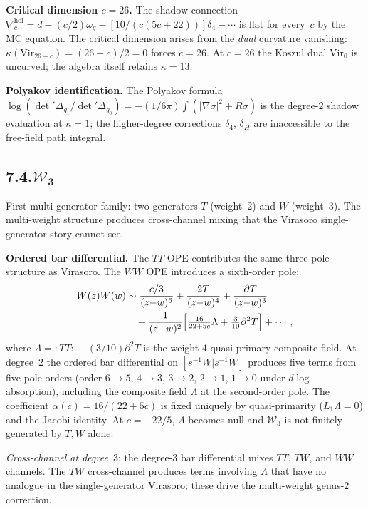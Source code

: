 \documentclass[11pt,reqno]{amsart}
\theoremstyle{definition}
\theoremstyle{remark}
\providecommand{\cW}{\mathcal{W}}
\providecommand{\Vir}{\mathrm{Vir}}
\providecommand{\hol}{\mathrm{hol}}
\numberwithin{equation}{section}
\begin{document}
\medskip\noindent\textbf{Critical dimension $c=26$.}\enspace
The shadow connection
$\nabla^{\hol}_c=d-(c/2)\omega_g
-[10/(c(5c+22))]\delta_4-\cdots$
is flat for every~$c$ by the MC equation. The critical dimension
arises from the \emph{dual} curvature vanishing:
$\kappa(\Vir_{26-c})=(26-c)/2=0$ forces $c=26$. At $c=26$ the
Koszul dual $\Vir_0$ is uncurved; the algebra itself retains
$\kappa=13$.

\medskip\noindent\textbf{Polyakov identification.}\enspace
The Polyakov formula
$\log(\det'\Delta_{g_1}/\det'\Delta_{g_0})
=-(1/6\pi)\int(|\nabla\sigma|^2+R\sigma)$
is the degree-$2$ shadow evaluation at $\kappa=1$; the
higher-degree corrections $\delta_4$, $\delta_H$ are
inaccessible to the free-field path integral.

\subsection*{7.4.\quad $\boldsymbol{\cW_3}$}

First multi-generator family: two generators $T$ (weight~$2$)
and $W$ (weight~$3$). The multi-weight structure produces
cross-channel mixing that the Virasoro single-generator story
cannot see.

\medskip\noindent\textbf{Ordered bar differential.}\enspace
The $TT$ OPE contributes the same three-pole structure as
Virasoro. The $WW$ OPE introduces a sixth-order pole:
\begin{align*}
W(z)W(w)
&\sim\frac{c/3}{(z{-}w)^6}+\frac{2T}{(z{-}w)^4}
+\frac{\partial T}{(z{-}w)^3}\\
&\quad+\frac{1}{(z{-}w)^2}\Bigl[\tfrac{16}{22+5c}\Lambda
+\tfrac{3}{10}\partial^2 T\Bigr]+\cdots,
\end{align*}
where $\Lambda=\!:TT:\!-(3/10)\partial^2 T$ is the weight-$4$
quasi-primary composite field. At degree~$2$ the ordered
bar differential on $[s^{-1}W|s^{-1}W]$ produces five
terms from five pole orders (order $6\to 5$, $4\to 3$,
$3\to 2$, $2\to 1$, $1\to 0$ under $d\log$ absorption),
including the composite field $\Lambda$ at the second-order
pole. The coefficient $\alpha(c)=16/(22+5c)$ is fixed
uniquely by quasi-primarity ($L_1\Lambda=0$) and the Jacobi
identity. At $c=-22/5$, $\Lambda$ becomes null and $\cW_3$
is not finitely generated by $T,W$ alone.

\emph{Cross-channel at degree~$3$}: the degree-$3$ bar
differential mixes $TT$, $TW$, and $WW$ channels. The
$TW$ cross-channel produces terms involving $\Lambda$ that
have no analogue in the single-generator Virasoro;
these drive the multi-weight genus-$2$ correction.
\end{document}
